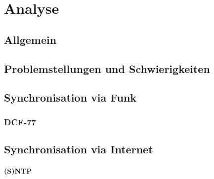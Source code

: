 
\chapter{Analyse}

\section{Allgemein}

\section{Problemstellungen und Schwierigkeiten}

\section{Synchronisation via Funk}

\subsection{DCF-77}

\section{Synchronisation via Internet}

\subsubsection{(S)NTP}